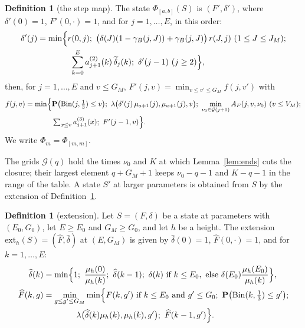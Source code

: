 \documentclass[11pt]{amsart}
\theoremstyle{definition}
\newtheorem{definition}[theorem]{Definition}
\numberwithin{equation}{section}
\newcommand{\lean}[1]{\ignorespaces}
\renewcommand{\P}{\mathbf{P}}
\newcommand{\Bin}{\operatorname{Bin}}
\begin{document}
\begin{definition}[the step map]\label{def:phi}\lean{FrogModel.D3.Iface.phiS, FrogModel.D3.Iface.deltaNew, FrogModel.D3.Iface.dTerms, FrogModel.D3.Iface.Fnew, FrogModel.D3.Iface.preF, FrogModel.D3.Iface.L12, FrogModel.D3.Iface.PB, FrogModel.D3.Iface.PA, FrogModel.D3.Iface.grid, FrogModel.D3.Iface.ratio, FrogModel.D3.Iface.Dt}
The state $\Phi_{[a,b]}(S)$ is $(F',\delta')$, where $\delta'(0)=1$, $F'(0,\cdot)=1$, and for $j=1,\dots,E$, in this order:
\begin{align*}
\delta'(j)&=\min\Bigl\{r(0,j);\ \bigl(\delta(J)(1-\gamma_B(j,J))+\gamma_B(j,J)\bigr)\,r(J,j)\ (1\le J\le J_M);\\
&\qquad\qquad\sum_{k=0}^Ea^{(2)}_{j+1}(k)\,\widetilde\delta_j(k);\ \delta'(j-1)\ (j\ge2)\Bigr\},
\end{align*}
then, for $j=1,\dots,E$ and $v\le G_M$, $F'(j,v)=\min_{v\le v'\le G_M}f(j,v')$ with
\begin{align*}
f(j,v)=\min\Bigl\{&\P\bigl(\Bin(j,\tfrac13)\le v\bigr);\ \lambda\bigl(\delta'(j)\,\mu_{a+1}(j),\mu_{a+1}(j),v\bigr);\ \min_{\nu_0\in\mathcal G(j+1)}A_F(j,v,\nu_0)\ (v\le V_M);\\
&\textstyle\sum_{x\le v}a^{(3)}_{j+1}(x);\ F'(j-1,v)\Bigr\}.
\end{align*}
We write $\Phi_m=\Phi_{[m,m]}$.
\end{definition}

The grids $\mathcal G(q)$ hold the times $\nu_0$ and $K$ at which Lemma~\ref{lem:ends} cuts the closure; their largest element $q+G_M+1$ keeps $\nu_0-q-1$ and $K-q-1$ in the range of the table. A state $S'$ at larger parameters is obtained from $S$ by the extension of Definition~\ref{def:ext}.

\begin{definition}[extension]\label{def:ext}\lean{FrogModel.D3.Iface.ext, FrogModel.D3.Iface.deltaExt, FrogModel.D3.Iface.FExt, FrogModel.D3.Iface.preExt}
Let $S=(F,\delta)$ be a state at parameters with $(E_0,G_0)$, let $E\ge E_0$ and $G_M\ge G_0$, and let $h$ be a height. The extension $\mathrm{ext}_h(S)=(\widehat F,\widehat\delta)$ at $(E,G_M)$ is given by $\widehat\delta(0)=1$, $\widehat F(0,\cdot)=1$, and for $k=1,\dots,E$:
\begin{align*}
\widehat\delta(k)&=\min\Bigl\{1;\ \frac{\mu_h(0)}{\mu_h(k)};\ \widehat\delta(k-1);\ \delta(k)\text{ if }k\le E_0,\ \text{else }\delta(E_0)\frac{\mu_h(E_0)}{\mu_h(k)}\Bigr\},\\
\widehat F(k,g)&=\min_{g\le g'\le G_M}\min\Bigl\{F(k,g')\text{ if }k\le E_0\text{ and }g'\le G_0;\ \P\bigl(\Bin(k,\tfrac13)\le g'\bigr);\\ %
&\qquad\qquad\lambda\bigl(\widehat\delta(k)\mu_h(k),\mu_h(k),g'\bigr);\ \widehat F(k-1,g')\Bigr\}. %
\end{align*}
\end{definition}
\end{document}
